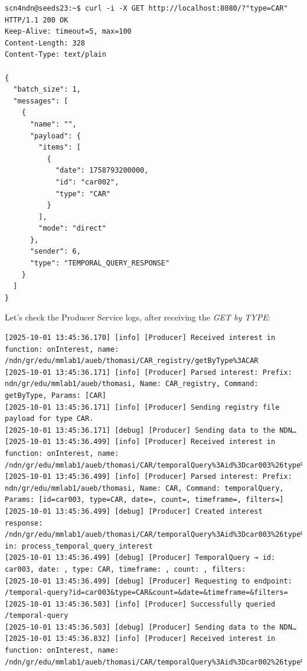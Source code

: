 \documentclass{article}
\begin{document}
\begin{lstlisting}[language=curl, caption={}, label={}]
scn4ndn@seeds23:~$ curl -i -X GET http://localhost:8080/?"type=CAR"
HTTP/1.1 200 OK
Keep-Alive: timeout=5, max=100
Content-Length: 328
Content-Type: text/plain

{
  "batch_size": 1,
  "messages": [
    {
      "name": "",
      "payload": {
        "items": [
          {
            "date": 1758793200000,
            "id": "car002",
            "type": "CAR"
          }
        ],
        "mode": "direct"
      },
      "sender": 6,
      "type": "TEMPORAL_QUERY_RESPONSE"
    }
  ]
} 
\end{lstlisting}

Let's check the Producer Service logs, after receiving the \emph{GET by TYPE}: 

\begin{lstlisting}[language=log, caption={Producer logs after receiving \emph{GET by TYPE} from the \emph{UMemphis} node.}, label={lst:after-receiving-get-by-type-umemphis}]
[2025-10-01 13:45:36.170] [info] [Producer] Received interest in function: onInterest, name: /ndn/gr/edu/mmlab1/aueb/thomasi/CAR_registry/getByType%3ACAR
[2025-10-01 13:45:36.171] [info] [Producer] Parsed interest: Prefix: ndn/gr/edu/mmlab1/aueb/thomasi, Name: CAR_registry, Command: getByType, Params: [CAR]
[2025-10-01 13:45:36.171] [info] [Producer] Sending registry file payload for type CAR.
[2025-10-01 13:45:36.171] [debug] [Producer] Sending data to the NDN…
[2025-10-01 13:45:36.499] [info] [Producer] Received interest in function: onInterest, name: /ndn/gr/edu/mmlab1/aueb/thomasi/CAR/temporalQuery%3Aid%3Dcar003%26type%3DCAR%26date%3D%26count%3D%26timeframe%3D%26filters%3D
[2025-10-01 13:45:36.499] [info] [Producer] Parsed interest: Prefix: ndn/gr/edu/mmlab1/aueb/thomasi, Name: CAR, Command: temporalQuery, Params: [id=car003, type=CAR, date=, count=, timeframe=, filters=]
[2025-10-01 13:45:36.499] [debug] [Producer] Created interest response: /ndn/gr/edu/mmlab1/aueb/thomasi/CAR/temporalQuery%3Aid%3Dcar003%26type%3DCAR%26date%3D%26count%3D%26timeframe%3D%26filters%3D in: process_temporal_query_interest
[2025-10-01 13:45:36.499] [debug] [Producer] TemporalQuery → id: car003, date: , type: CAR, timeframe: , count: , filters: 
[2025-10-01 13:45:36.499] [debug] [Producer] Requesting to endpoint: /temporal-query?id=car003&type=CAR&count=&date=&timeframe=&filters=
[2025-10-01 13:45:36.503] [info] [Producer] Successfully queried /temporal-query
[2025-10-01 13:45:36.503] [debug] [Producer] Sending data to the NDN…
[2025-10-01 13:45:36.832] [info] [Producer] Received interest in function: onInterest, name: /ndn/gr/edu/mmlab1/aueb/thomasi/CAR/temporalQuery%3Aid%3Dcar002%26type%3DCAR%26date%3D%26count%3D%26timeframe%3D%26filters%3D

\end{lstlisting}
\end{document}
